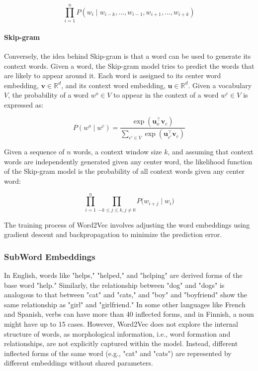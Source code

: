 \begin{equation}
    \prod_{i=1}^{n} P(w_i \mid w_{i-k}, ..., w_{i-1},  w_{i+1}, ..., w_{i+k})
\end{equation}

\paragraph{Skip-gram} 

Conversely, the idea behind Skip-gram is that a word can be used to generate its context words. Given a word, the Skip-gram model tries to predict the words that are likely to appear around it. Each word is assigned to its center word embedding, $\bm{v} \in \mathbb{R}^{d}$, and its context word embedding, $\bm{u} \in \mathbb{R}^{d}$. Given a vocabulary $V$, the  probability of a word $w^o \in V$ to appear in the context of a word $w^c \in V$ is expressed as:

\begin{equation}
    P(w^o \mid w^c) = \frac{\exp (\bm{u}_{o}^{\top}\bm{v}_{c})}{\sum_{c' \in V} \exp (\bm{u}_{c'}^{\top} \bm{v}_{c})}
\end{equation}

Given a sequence of $n$ words, a context window size $k$, and assuming that context words are independently generated given any center word, the likelihood function of the Skip-gram model is the probability of all context words given any center word:

\begin{equation}
    \prod_{i=1}^n \prod_{-k \leq j \leq k, j \neq 0} P\bigl(w_{i+j} \mid w_i \bigr)
\end{equation}


The training process of Word2Vec involves adjusting the word embeddings using gradient descent and backpropagation to minimize the prediction error. 
 
\subsubsection{SubWord Embeddings}

In English, words like "helps," "helped," and "helping" are derived forms of the base word "help." Similarly, the relationship between "dog" and "dogs" is analogous to that between "cat" and "cats," and "boy" and "boyfriend" show the same relationship as "girl" and "girlfriend." In some other languages like French and Spanish, verbs can have more than 40 inflected forms, and in Finnish, a noun might have up to 15 cases. However, Word2Vec does not explore the internal structure of words, as morphological information, i.e., word formation and relationships, are not explicitly captured within the model. Instead, different inflected forms of the same word (e.g., "cat" and "cats") are represented by different embeddings without shared parameters. 


